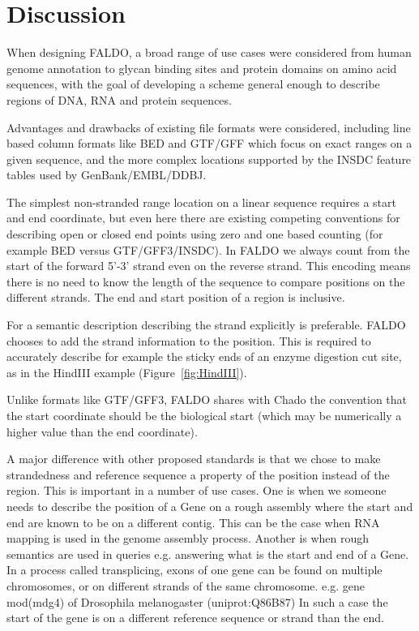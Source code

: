 \section*{Discussion}
When designing FALDO, a broad range of use cases were considered from
human genome annotation to glycan binding sites and protein domains on
amino acid sequences, with the goal of developing a scheme general enough
to describe regions of DNA, RNA and protein sequences.

Advantages and drawbacks of existing file formats were considered, including
line based column formats like BED and GTF/GFF which focus on exact
ranges on a given sequence, and the more complex locations supported
by the INSDC feature tables used by GenBank/EMBL/DDBJ.

The simplest non-stranded range location on a linear sequence requires
a start and end coordinate, but even here there are existing competing
conventions for describing open or closed end points using zero and
one based counting (for example BED versus GTF/GFF3/INSDC).
In FALDO we always count from the start of the forward 5'-3' strand even on the reverse strand.
This encoding means there is no need to know the length of the sequence to compare positions on the different strands.
The end and start position of a region is inclusive.



For a semantic description describing the strand explicitly is preferable.
FALDO chooses to add the strand information to the position. 
This is required to accurately describe for example the sticky ends
of an enzyme digestion cut site, as in the HindIII example (Figure~\ref{fig:HindIII}).

Unlike formats like GTF/GFF3, FALDO shares with Chado\cite{Chado2007} the convention
that the start coordinate should be the biological start (which 
may be numerically a higher value than the end coordinate).

A major difference with other proposed standards is that we chose to make strandedness and reference sequence a property of the position instead of the region.
This is important in a number of use cases.
One is when we someone needs to describe the position of a Gene on a rough assembly where the start and end are known to be on a different contig. 
This can be the case when RNA mapping is used in the genome assembly process.
Another is when rough semantics are used in queries e.g. answering what is the start and end of a Gene. 
In a process called transplicing, exons of one gene can be found on multiple chromosomes, or on different strands of the same chromosome. e.g. 
gene mod(mdg4) of Drosophila melanogaster (uniprot:Q86B87)
In such a case the start of the gene is on a different reference sequence or strand than the end.

